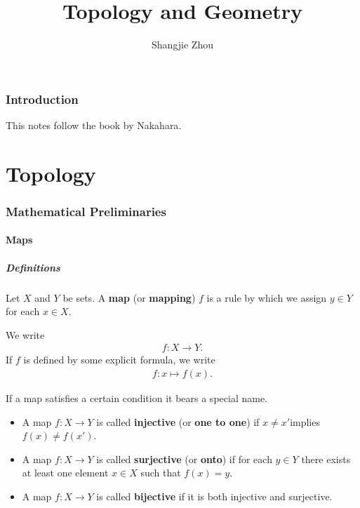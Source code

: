 \documentclass[10pt]{article}
\begin{document}
\title{Topology and Geometry}
\author{Shangjie Zhou}

\maketitle

\section*{Introduction}
This notes follow the book by Nakahara\cite{Nakahara:1990th}.
\clearpage
\part{Topology}
\section{Mathematical Preliminaries}
\subsection{Maps}
\subsubsection{Definitions}
\begin{definition}[Map]
    Let $X$ and $Y$ be sets.
    A \textbf{map} (or \textbf{mapping}) $f$ is a rule by which we assign $y\in Y$ for each $x\in X$.
\end{definition}
We write
\begin{align}
    f:X\to Y.
\end{align}
If $f$ is defined by some explicit formula, we write
\begin{align}
    f:x\mapsto f(x).
\end{align}

\begin{definition}
    If a map satisfies a certain condition it bears a special name.
    \begin{itemize}
        \item A map $f:X\to Y$ is called \textbf{injective} (or \textbf{one to one}) if $x\neq x'$implies $f(x)\neq f(x')$.
        \item A map $f:X\to Y$ is called \textbf{surjective} (or \textbf{onto}) if for each $y\in Y$ there exists at least one element $x\in X$ such that $f(x)=y$.
        \item A map $f:X\to Y$ is called \textbf{bijective} if it is both injective and surjective.
    \end{itemize}
\end{definition}
\end{document}
